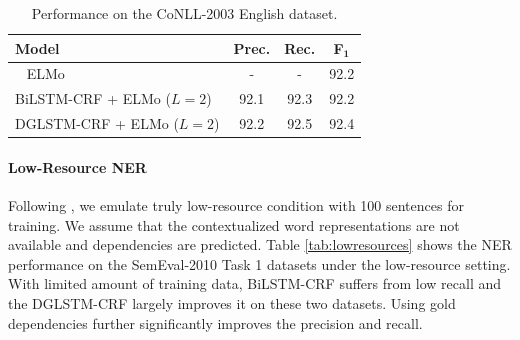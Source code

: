 \begin{table}[h!]
	\centering
	\begin{tabular}{lccc}
		\toprule
		\textbf{Model} & \textbf{Prec.} & \textbf{Rec.} &   \textbf{F}$_\mathbf{1}$\\
		\midrule
		\citet{peters2018deep}~ ELMo  &  -& - &92.2 \\
		\cdashlinelr{1-4}
		BiLSTM-CRF  + {\footnotesize ELMo ($L=2$)}  &  92.1 & 92.3 &    92.2 \\
		DGLSTM-CRF + {\footnotesize ELMo ($L=2$)} & 92.2&92.5 &92.4\\
		\bottomrule
	\end{tabular}
	\caption{Performance on the CoNLL-2003 English dataset.}
	\label{tab:resconll}
\end{table}





\paragraph{Low-Resource NER}
Following \citet{cotterell2017low}, we emulate truly low-resource condition with 100 sentences for training.
We assume that the contextualized word representations are not available and dependencies are predicted. 
Table \ref{tab:lowresources} shows the NER performance on the SemEval-2010 Task 1 datasets under the low-resource setting. 
With limited amount of training data, BiLSTM-CRF suffers from low recall and the DGLSTM-CRF largely improves it on these two datasets. 
Using gold dependencies further significantly improves the precision and recall. 

